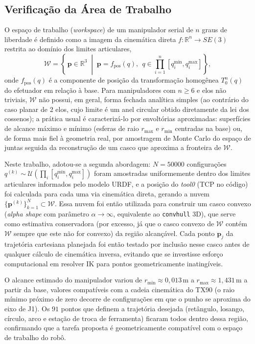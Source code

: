 \subsection{Verificação da Área de Trabalho}

O espaço de trabalho (\textit{workspace}) de um manipulador serial de $n$
graus de liberdade é definido como a imagem da cinemática direta
$f:\mathbb{R}^n \to SE(3)$ restrita ao domínio dos limites articulares,
\begin{equation}
\mathcal{W} = \left\{\, \mathbf{p} \in \mathbb{R}^3 \;\middle|\;
\mathbf{p} = f_{\text{pos}}(q),\ \ q \in \prod_{i=1}^{n}
\left[q_i^{\min}, q_i^{\max}\right] \right\},
\label{eq:workspace_def}
\end{equation}
onde $f_{\text{pos}}(q)$ é a componente de posição da transformação
homogênea $T_0^n(q)$ do efetuador em relação à base. Para manipuladores com
$n \geq 6$ e elos não triviais, $\mathcal{W}$ não possui, em geral, forma
fechada analítica simples (ao contrário do caso planar de 2 elos, cujo
limite é um anel circular obtido diretamente da lei dos cossenos); a
prática usual é caracterizá-lo por envoltórias aproximadas: superfícies de
alcance máximo e mínimo (esferas de raio $r_{\max}$ e $r_{\min}$ centradas
na base) ou, de forma mais fiel à geometria real, por amostragem de
Monte Carlo do espaço de juntas seguida da reconstrução de um casco que
aproxima a fronteira de $\mathcal{W}$.

Neste trabalho, adotou-se a segunda abordagem: $N = 50000$ configurações
$q^{(k)} \sim \mathcal{U}\!\left(\prod_i [q_i^{\min}, q_i^{\max}]\right)$
foram amostradas uniformemente dentro dos limites articulares informados
pelo modelo URDF, e a posição do \textit{tool0} (TCP no código) foi calculada para cada uma
via cinemática direta, gerando a nuvem $\{\mathbf{p}^{(k)}\}_{k=1}^{N}
\subset \mathcal{W}$. Essa nuvem foi então utilizada para construir um
casco convexo (\textit{alpha shape} com parâmetro $\alpha \to \infty$,
equivalente ao \texttt{convhull} 3D), que serve como estimativa
conservadora (por excesso, já que o casco convexo de $\mathcal{W}$ contém
$\mathcal{W}$ sempre que este não for convexo) da região alcançável. Cada
ponto $\mathbf{p}_j$ da trajetória cartesiana planejada foi então testado
por inclusão nesse casco antes de qualquer cálculo de cinemática inversa,
evitando que se investisse esforço computacional em resolver IK para
pontos geometricamente inatingíveis.

O alcance estimado do manipulador variou de $r_{\min} \approx
0{,}013\,\text{m}$ a $r_{\max} \approx 1{,}431\,\text{m}$ a partir da base,
valores compatíveis com a cadeia cinemática do TX90 (o raio mínimo próximo
de zero decorre de configurações em que o punho se aproxima do eixo de
J1). Os $91$ pontos que definem a trajetória desejada (retângulo, losango,
círculo, arco e estação de troca de ferramenta) ficaram todos dentro dessa
região, confirmando que a tarefa proposta é geometricamente compatível com
o espaço de trabalho do robô.

